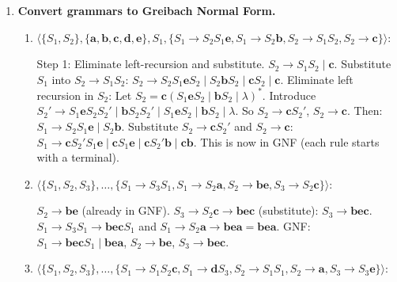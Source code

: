 \begin{enumerate}[{9.}1. ]
\begin{enumerate}
\item $\langle\{T\},\{\pmb{a},\pmb{b},\pmb{c},\pmb{d},\pmb{-},\pmb{+}\},T,\{T\to\pmb{a}|\pmb{b}|\pmb{c}|\pmb{d}|T\pmb{-}T|T\pmb{+}T\}\rangle$:

$T \to \pmb{a}|\pmb{b}|\pmb{c}|\pmb{d}$: Already in CNF (terminal productions).
$T \to T\pmb{-}T$: $T \to TD_-$ where $D_- \to T_{-}T$ and $T_- \to \pmb{-}$.
$T \to T\pmb{+}T$: $T \to TD_+$ where $D_+ \to T_+T$ and $T_+ \to \pmb{+}$.

Final CNF:
\[
T \to \pmb{a}|\pmb{b}|\pmb{c}|\pmb{d}\mid TD_-\mid TD_+,\quad D_- \to T_-T,\quad D_+ \to T_+T,\quad T_- \to \pmb{-},\quad T_+ \to \pmb{+}.
\]
\end{enumerate}

\item \textbf{Convert grammars to Greibach Normal Form.}

\begin{enumerate}
\item $\langle\{S_1,S_2\},\{\pmb{a},\pmb{b},\pmb{c},\pmb{d},\pmb{e}\},S_1,\{S_1\to S_2S_1\pmb{e},S_1\to S_2\pmb{b},S_2\to S_1S_2,S_2\to\pmb{c}\}\rangle$:

Step 1: Eliminate left-recursion and substitute.
$S_2 \to S_1 S_2 \mid \pmb{c}$.
Substitute $S_1$ into $S_2 \to S_1 S_2$:
$S_2 \to S_2 S_1 \pmb{e} S_2 \mid S_2 \pmb{b} S_2 \mid \pmb{c} S_2 \mid \pmb{c}$.
Eliminate left recursion in $S_2$: Let $S_2 = \pmb{c}(S_1\pmb{e}S_2 \mid \pmb{b}S_2 \mid \lambda)^*$.
Introduce $S_2' \to S_1\pmb{e}S_2S_2' \mid \pmb{b}S_2S_2' \mid S_1\pmb{e}S_2 \mid \pmb{b}S_2 \mid \lambda$.
So $S_2 \to \pmb{c}S_2'$, $S_2 \to \pmb{c}$.
Then: $S_1 \to S_2 S_1 \pmb{e} \mid S_2 \pmb{b}$.
Substitute $S_2 \to \pmb{c}S_2'$ and $S_2 \to \pmb{c}$:
$S_1 \to \pmb{c}S_2'S_1\pmb{e} \mid \pmb{c}S_1\pmb{e} \mid \pmb{c}S_2'\pmb{b} \mid \pmb{c}\pmb{b}$.
This is now in GNF (each rule starts with a terminal).

\item $\langle\{S_1,S_2,S_3\},\ldots,\{S_1\to S_3S_1, S_1\to S_2\pmb{a},S_2\to\pmb{be},S_3\to S_2\pmb{c}\}\rangle$:

$S_2 \to \pmb{be}$ (already in GNF).
$S_3 \to S_2\pmb{c} \to \pmb{be}\pmb{c}$ (substitute): $S_3 \to \pmb{bec}$.
$S_1 \to S_3 S_1 \to \pmb{bec}S_1$ and $S_1 \to S_2\pmb{a} \to \pmb{be}\pmb{a} = \pmb{bea}$.
GNF: $S_1 \to \pmb{bec}S_1 \mid \pmb{bea}$, $S_2 \to \pmb{be}$, $S_3 \to \pmb{bec}$.

\item $\langle\{S_1,S_2,S_3\},\ldots,\{S_1\to S_1S_2\pmb{c},S_1\to\pmb{d}S_3,S_2\to S_1S_1,S_2\to\pmb{a},S_3\to S_3\pmb{e}\}\rangle$:


\end{enumerate}
\end{enumerate}
